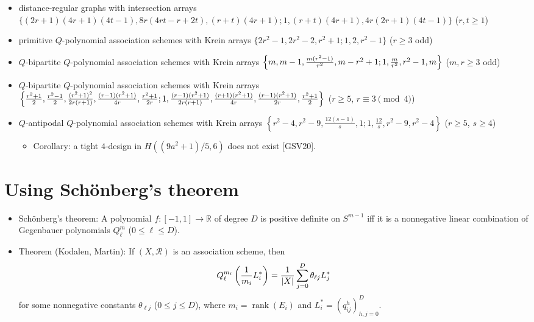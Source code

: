 \documentclass[11pt]{article}
\providecommand{\tightlist}{%
      \setlength{\itemsep}{0pt}\setlength{\parskip}{0pt}}
\renewcommand{\textbf}[1]{\textcolor[rgb]{1,0,0}{{#1}}}
\renewcommand{\emph}[1]{\textcolor[rgb]{0,0,1}{{#1}}}
\renewcommand{\sout}[1]{\textcolor[rgb]{0,0.5,0}{{#1}}}
\begin{document}
\begin{itemize}
\tightlist
\item
  \emph{distance-regular graphs} with \emph{intersection arrays}
  \sout{\(\{(2r+1)(4r+1)(4t-1), 8r(4rt-r+2t), (r+t)(4r+1); 1, (r+t)(4r+1), 4r(2r+1)(4t-1)\}\)}
  (\textbf{\(r, t \ge 1\)})
\item
  \emph{primitive \(Q\)-polynomial association schemes} with \emph{Krein
  arrays} \sout{\(\{2r^2-1, 2r^2-2, r^2+1; 1, 2, r^2-1\}\)}
  (\textbf{\(r \ge 3\) odd})
\item
  \emph{\(Q\)-bipartite \(Q\)-polynomial association schemes} with
  \emph{Krein arrays}
  \sout{\(\left\{m, m-1, {m(r^2-1) \over r^2}, m-r^2+1; 1, {m \over r^2}, r^2-1, m\right\}\)}
  (\textbf{\(m, r \ge 3\) odd})
\item
  \emph{\(Q\)-bipartite \(Q\)-polynomial association schemes} with
  \emph{Krein arrays}
  \sout{\(\left\{{r^2+1 \over 2}, {r^2-1 \over 2}, {(r^2+1)^2 \over 2r(r+1)},  {(r-1)(r^2+1) \over 4r}, {r^2+1 \over 2r};  1, {(r-1)(r^2+1) \over 2r(r+1)}, {(r+1)(r^2 + 1) \over 4r},  {(r-1)(r^2+1) \over 2r}, {r^2+1 \over 2}\right\}\)}
  (\textbf{\(r \ge 5\)}, \textbf{\(r \equiv 3 \pmod{4}\)})
\item
  \emph{\(Q\)-antipodal \(Q\)-polynomial association schemes} with
  \emph{Krein arrays}
  \sout{\(\left\{r^2 - 4, r^2 - 9, \frac{12(s-1)}{s}, 1; 1, \frac{12}{s}, r^2 - 9, r^2 - 4\right\}\)}
  (\textbf{\(r \ge 5\)}, \textbf{\(s \ge 4\)})

  \begin{itemize}
  \tightlist
  \item
    \textbf{Corollary}: a \emph{tight \(4\)-design} in
    \textbf{\(H((9a^2+1)/5,6)\)} \sout{does not exist} {[}GSV20{]}.
  \end{itemize}
\end{itemize}

    \hypertarget{using-schuxf6nbergs-theorem}{%
\section*{Using Schönberg's
theorem}\label{using-schuxf6nbergs-theorem}}

\begin{itemize}
\tightlist
\item
  \textbf{Schönberg's theorem}: A \emph{polynomial}
  \textbf{\(f: [-1, 1] \to \mathbb{R}\)} of degree \textbf{\(D\)} is
  \sout{positive definite on \(S^{m-1}\)} iff it is a \sout{nonnegative
  linear combination} of \emph{Gegenbauer polynomials}
  \textbf{\(Q^m_{\ell}\)} (\textbf{\(0 \le \ell \le D\)}).
\item
  \textbf{Theorem} (\emph{Kodalen, Martin}): If
  \textbf{\((X, \mathcal{R})\)} is an \emph{association scheme}, then
  \sout{\[
  Q_{\ell}^{m_i} \left({1 \over m_i} L^*_i \right) = {1 \over |X|} \sum_{j=0}^D \theta_{\ell j} L^*_j
  \]} for some \sout{nonnegative constants} \textbf{\(\theta_{\ell j}\)}
  (\textbf{\(0 \le j \le D\)}), where
  \textbf{\(m_i = \operatorname{rank}(E_i)\)} and
  \textbf{\(L^*_i = (q^h_{ij})_{h,j=0}^D\)}.
\end{itemize}
\end{document}
